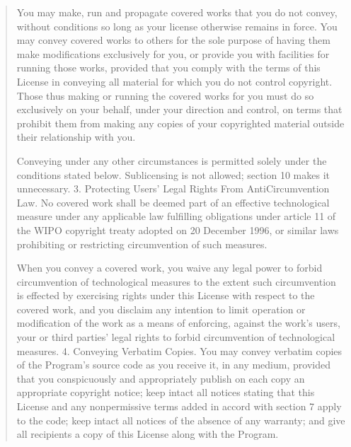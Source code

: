 \documentclass[letterpaper,10pt,english]{sphinxmanual}
\begin{document}
\begin{quote}
You may make, run and propagate covered works that you do not convey, without conditions so long as your license otherwise remains in force. You may convey covered works to others for the sole purpose of having them make modifications exclusively for you, or provide you with facilities for running those works, provided that you comply with the terms of this License in conveying all material for which you do not control copyright. Those thus making or running the covered works for you must do so exclusively on your behalf, under your direction and control, on terms that prohibit them from making any copies of your copyrighted material outside their relationship with you.

Conveying under any other circumstances is permitted solely under the conditions stated below. Sublicensing is not allowed; section 10 makes it unnecessary.
3. Protecting Users’ Legal Rights From Anti\sphinxhyphen{}Circumvention Law.
No covered work shall be deemed part of an effective technological measure under any applicable law fulfilling obligations under article 11 of the WIPO copyright treaty adopted on 20 December 1996, or similar laws prohibiting or restricting circumvention of such measures.

When you convey a covered work, you waive any legal power to forbid circumvention of technological measures to the extent such circumvention is effected by exercising rights under this License with respect to the covered work, and you disclaim any intention to limit operation or modification of the work as a means of enforcing, against the work’s users, your or third parties’ legal rights to forbid circumvention of technological measures.
4. Conveying Verbatim Copies.
You may convey verbatim copies of the Program’s source code as you receive it, in any medium, provided that you conspicuously and appropriately publish on each copy an appropriate copyright notice; keep intact all notices stating that this License and any non\sphinxhyphen{}permissive terms added in accord with section 7 apply to the code; keep intact all notices of the absence of any warranty; and give all recipients a copy of this License along with the Program.


\end{quote}
\end{document}
